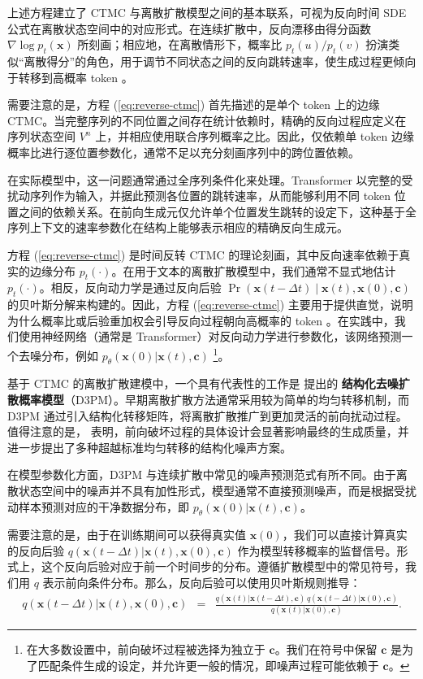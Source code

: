 上述方程建立了 CTMC 与离散扩散模型之间的基本联系，可视为反向时间 SDE 公式在离散状态空间中的对应形式。在连续扩散中，反向漂移由得分函数 $\nabla \log p_t(\mathbf{x})$ 所刻画；相应地，在离散情形下，概率比 $p_t(u)/p_t(v)$ 扮演类似“离散得分”的角色，用于调节不同状态之间的反向跳转速率，使生成过程更倾向于转移到高概率 token 。

需要注意的是，方程 (\ref{eq:reverse-ctmc}) 首先描述的是单个 token 上的边缘 CTMC。当完整序列的不同位置之间存在统计依赖时，精确的反向过程应定义在序列状态空间 $V^n$ 上，并相应使用联合序列概率之比。因此，仅依赖单 token 边缘概率比进行逐位置参数化，通常不足以充分刻画序列中的跨位置依赖。

在实际模型中，这一问题通常通过全序列条件化来处理。Transformer 以完整的受扰动序列作为输入，并据此预测各位置的跳转速率，从而能够利用不同 token 位置之间的依赖关系。在前向生成元仅允许单个位置发生跳转的设定下，这种基于全序列上下文的速率参数化在结构上能够表示相应的精确反向生成元。


方程 (\ref{eq:reverse-ctmc}) 是时间反转 CTMC 的理论刻画，其中反向速率依赖于真实的边缘分布 $p_t(\cdot)$。在用于文本的离散扩散模型中，我们通常不显式地估计 $p_t(\cdot)$。相反，反向动力学是通过反向后验 $\Pr(\mathbf{x}(t-\Delta t)\mid \mathbf{x}(t),\mathbf{x}(0),\mathbf{c})$ 的贝叶斯分解来构建的。因此，方程 (\ref{eq:reverse-ctmc}) 主要用于提供直觉，说明为什么概率比或后验重加权会引导反向过程朝向高概率的 token 。在实践中，我们使用神经网络（通常是 Transformer）对反向动力学进行参数化，该网络预测一个去噪分布，例如 $p_\theta(\mathbf{x}(0)| \mathbf{x}(t),\mathbf{c})$ \footnote{在大多数设置中，前向破坏过程被选择为独立于 $\mathbf{c}$。我们在符号中保留 $\mathbf{c}$ 是为了匹配条件生成的设定，并允许更一般的情况，即噪声过程可能依赖于 $\mathbf{c}$。}。

基于 CTMC 的离散扩散建模中，一个具有代表性的工作是 \citet{austin-etal:2021structured} 提出的 \textbf{结构化去噪扩散概率模型}（D3PM）。早期离散扩散方法通常采用较为简单的均匀转移机制，而 D3PM 通过引入结构化转移矩阵，将离散扩散推广到更加灵活的前向扰动过程。值得注意的是，\citet{austin-etal:2021structured} 表明，前向破坏过程的具体设计会显著影响最终的生成质量，并进一步提出了多种超越标准均匀转移的结构化噪声方案。

在模型参数化方面，D3PM 与连续扩散中常见的噪声预测范式有所不同。由于离散状态空间中的噪声并不具有加性形式，模型通常不直接预测噪声，而是根据受扰动样本预测对应的干净数据分布，即
$p_\theta(\mathbf{x}(0) | \mathbf{x}(t), \mathbf{c})$。

需要注意的是，由于在训练期间可以获得真实值 $\mathbf{x}(0)$，我们可以直接计算真实的反向后验 $q(\mathbf{x}(t - \Delta t) | \mathbf{x}(t), \mathbf{x}(0), \mathbf{c})$ 作为模型转移概率的监督信号。形式上，这个反向后验对应于前一个时间步的分布。遵循扩散模型中的常见符号，我们用 $q$ 表示前向条件分布。那么，反向后验可以使用贝叶斯规则推导：
\begin{eqnarray}
q(\mathbf{x}(t - \Delta t) | \mathbf{x}(t), \mathbf{x}(0), \mathbf{c}) & = & \frac{q(\mathbf{x}(t) | \mathbf{x}(t - \Delta t), \mathbf{c}) \, q(\mathbf{x}(t - \Delta t) | \mathbf{x}(0), \mathbf{c})}{q(\mathbf{x}(t) | \mathbf{x}(0), \mathbf{c})}.
\end{eqnarray}

